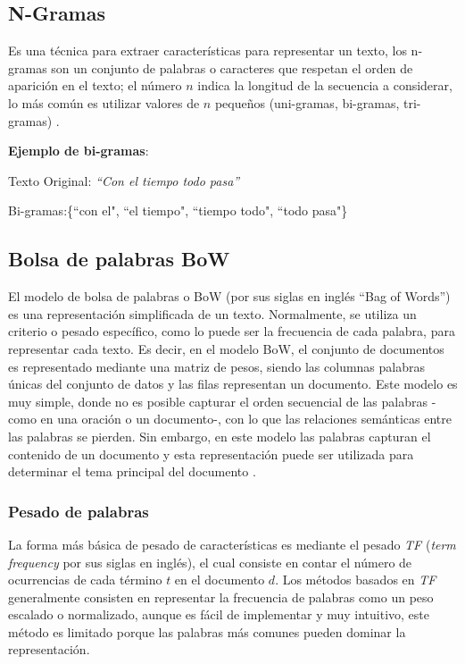 \subsection{N-Gramas}
Es una técnica para extraer características para representar un texto, los n-gramas son un conjunto de palabras o caracteres que respetan el orden de aparición en el texto; el número $n$ indica la longitud de la secuencia a considerar, lo más común es utilizar valores de $n$ pequeños (uni-gramas, bi-gramas, tri-gramas) \citep{kowsari2019text}. 

\textbf{Ejemplo de bi-gramas}: 

Texto Original: \textit{``Con el tiempo todo pasa''}

Bi-gramas:\{``con el", ``el tiempo", ``tiempo todo", ``todo pasa"\}


\subsection{Bolsa de palabras BoW}
El modelo de bolsa de palabras o BoW (por sus siglas en inglés ``Bag of Words'') es una representación simplificada de un texto. Normalmente, se utiliza un criterio o pesado específico, como lo puede ser la frecuencia de cada palabra, para representar cada texto. Es decir, en el modelo BoW, el conjunto de documentos es representado mediante una matriz de pesos, siendo las columnas palabras únicas del conjunto de datos y las filas representan un documento. Este modelo es muy simple, donde no es posible capturar el orden secuencial de las palabras -como en una oración o un documento-, con lo que las relaciones semánticas entre las palabras se pierden. Sin embargo, en este modelo las palabras capturan el contenido de un documento y esta representación puede ser utilizada para determinar el tema principal del documento \citep{kowsari2019text}.


\subsubsection{Pesado de palabras} La forma más básica de pesado de características es mediante el pesado \textit{TF} (\textit{term frequency} por sus siglas en inglés), el cual consiste en contar el número de ocurrencias de cada término $t$ en el documento $d$. Los métodos basados en \textit{TF} generalmente consisten en representar la frecuencia de palabras como un peso escalado o normalizado, aunque es fácil de implementar y muy intuitivo, este método es limitado porque las palabras más comunes pueden dominar la representación.

